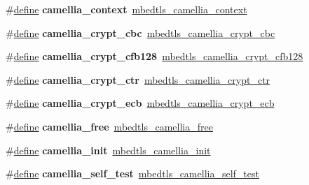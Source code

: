 \begin{DoxyCompactItemize}
\mbox{\label{compat-1_83_8h_a1f9bdd9db4bda932cba612c6e9b357bd}} 
\#\hyperlink{structdefine}{define} {\bfseries camellia\+\_\+context}~\hyperlink{structmbedtls__camellia__context}{mbedtls\+\_\+camellia\+\_\+context}
\item 
\mbox{\label{compat-1_83_8h_a9b439cd7dd824b4a6d89ba9e6f1fd15c}} 
\#\hyperlink{structdefine}{define} {\bfseries camellia\+\_\+crypt\+\_\+cbc}~\hyperlink{camellia_8h_a6121d988f0fa571adbb3eea80560c545}{mbedtls\+\_\+camellia\+\_\+crypt\+\_\+cbc}
\item 
\mbox{\label{compat-1_83_8h_a69b290f0ef2d1102155dd0d8af8e599f}} 
\#\hyperlink{structdefine}{define} {\bfseries camellia\+\_\+crypt\+\_\+cfb128}~\hyperlink{camellia_8h_afffb8f6eeac954fbdddb3c99ad0f87c6}{mbedtls\+\_\+camellia\+\_\+crypt\+\_\+cfb128}
\item 
\mbox{\label{compat-1_83_8h_acfd5d988e7758c76d9d2276e6c8844dc}} 
\#\hyperlink{structdefine}{define} {\bfseries camellia\+\_\+crypt\+\_\+ctr}~\hyperlink{camellia_8h_ae90ed9ce4edf59d5219c64a0d2b3d23d}{mbedtls\+\_\+camellia\+\_\+crypt\+\_\+ctr}
\item 
\mbox{\label{compat-1_83_8h_a20764e83972b8d7079d170f05548d61f}} 
\#\hyperlink{structdefine}{define} {\bfseries camellia\+\_\+crypt\+\_\+ecb}~\hyperlink{camellia_8h_a4399c4d56cd27ffb610abeb70d51f8f7}{mbedtls\+\_\+camellia\+\_\+crypt\+\_\+ecb}
\item 
\mbox{\label{compat-1_83_8h_a48d6af2d2cf9dad0849f06a4cbac8723}} 
\#\hyperlink{structdefine}{define} {\bfseries camellia\+\_\+free}~\hyperlink{camellia_8h_aba5133cc77aeaa8e033caec90c2558eb}{mbedtls\+\_\+camellia\+\_\+free}
\item 
\mbox{\label{compat-1_83_8h_abbd4cea0d122ee5d8aab1dbc930e317c}} 
\#\hyperlink{structdefine}{define} {\bfseries camellia\+\_\+init}~\hyperlink{camellia_8h_a690881134930d8c0f9590c6ac1c0af95}{mbedtls\+\_\+camellia\+\_\+init}
\item 
\mbox{\label{compat-1_83_8h_a5aaea3248fdbc92e7a8a5920b9cde299}} 
\#\hyperlink{structdefine}{define} {\bfseries camellia\+\_\+self\+\_\+test}~\hyperlink{camellia_8h_a138e7a2aaf404d9f55dbc809b99c415e}{mbedtls\+\_\+camellia\+\_\+self\+\_\+test}

\end{DoxyCompactItemize}
